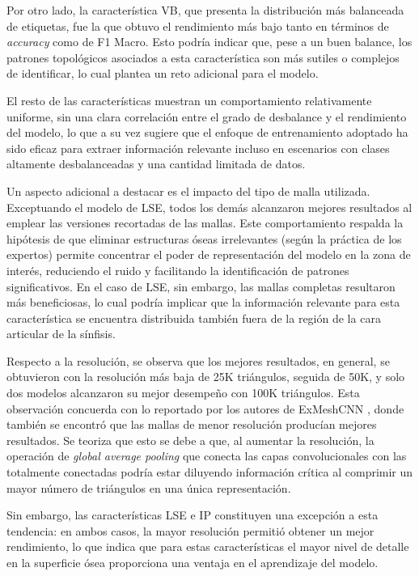 Por otro lado, la característica VB, que presenta la distribución más balanceada de etiquetas, fue la que obtuvo el rendimiento más bajo tanto en términos de \textit{accuracy} como de F1 Macro. Esto podría indicar que, pese a un buen balance, los patrones topológicos asociados a esta característica son más sutiles o complejos de identificar, lo cual plantea un reto adicional para el modelo.

El resto de las características muestran un comportamiento relativamente uniforme, sin una clara correlación entre el grado de desbalance y el rendimiento del modelo, lo que a su vez sugiere que el enfoque de entrenamiento adoptado ha sido eficaz para extraer información relevante incluso en escenarios con clases altamente desbalanceadas y una cantidad limitada de datos.

Un aspecto adicional a destacar es el impacto del tipo de malla utilizada. Exceptuando el modelo de LSE, todos los demás alcanzaron mejores resultados al emplear las versiones recortadas de las mallas. Este comportamiento respalda la hipótesis de que eliminar estructuras óseas irrelevantes (según la práctica de los expertos) permite concentrar el poder de representación del modelo en la zona de interés, reduciendo el ruido y facilitando la identificación de patrones significativos. En el caso de LSE, sin embargo, las mallas completas resultaron más beneficiosas, lo cual podría implicar que la información relevante para esta característica se encuentra distribuida también fuera de la región de la cara articular de la sínfisis.

Respecto a la resolución, se observa que los mejores resultados, en general, se obtuvieron con la resolución más baja de 25K triángulos, seguida de 50K, y solo dos modelos alcanzaron su mejor desempeño con 100K triángulos. Esta observación concuerda con lo reportado por los autores de ExMeshCNN \cite{kim_exmeshcnn_2022}, donde también se encontró que las mallas de menor resolución producían mejores resultados. Se teoriza que esto se debe a que, al aumentar la resolución, la operación de \textit{global average pooling} que conecta las capas convolucionales con las totalmente conectadas podría estar diluyendo información crítica al comprimir un mayor número de triángulos en una única representación.

Sin embargo, las características LSE e IP constituyen una excepción a esta tendencia: en ambos casos, la mayor resolución permitió obtener un mejor rendimiento, lo que indica que para estas características el mayor nivel de detalle en la superficie ósea proporciona una ventaja en el aprendizaje del modelo.

